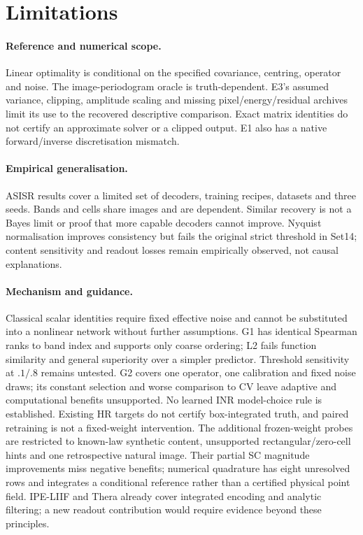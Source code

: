 \section{Limitations}\label{sec:limits}
\paragraph{Reference and numerical scope.} Linear optimality is conditional on the specified covariance, centring, operator and noise. The image-periodogram oracle is truth-dependent. E3's assumed variance, clipping, amplitude scaling and missing pixel/energy/residual archives limit its use to the recovered descriptive comparison. Exact matrix identities do not certify an approximate solver or a clipped output. E1 also has a native forward/inverse discretisation mismatch.

\paragraph{Empirical generalisation.} ASISR results cover a limited set of decoders, training recipes, datasets and three seeds. Bands and cells share images and are dependent. Similar recovery is not a Bayes limit or proof that more capable decoders cannot improve. Nyquist normalisation improves consistency but fails the original strict threshold in Set14; content sensitivity and readout losses remain empirically observed, not causal explanations.

\paragraph{Mechanism and guidance.} Classical scalar identities require fixed effective noise and cannot be substituted into a nonlinear network without further assumptions. G1 has identical Spearman ranks to band index and supports only coarse ordering; L2 fails function similarity and general superiority over a simpler predictor. Threshold sensitivity at $.1/.8$ remains untested. G2 covers one operator, one calibration and fixed noise draws; its constant selection and worse comparison to CV leave adaptive and computational benefits unsupported. No learned INR model-choice rule is established. Existing HR targets do not certify box-integrated truth, and paired retraining is not a fixed-weight intervention. The additional frozen-weight probes are restricted to known-law synthetic content, unsupported rectangular/zero-cell hints and one retrospective natural image. Their partial SC magnitude improvements miss negative benefits; numerical quadrature has eight unresolved rows and integrates a conditional reference rather than a certified physical point field. IPE-LIIF and Thera already cover integrated encoding and analytic filtering; a new readout contribution would require evidence beyond these principles.

